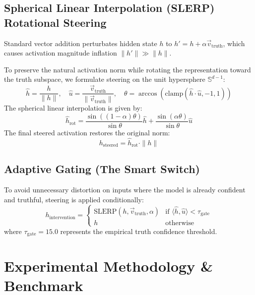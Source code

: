 \documentclass[11pt]{article}
\begin{document}
\subsection{Spherical Linear Interpolation (SLERP) Rotational Steering}
Standard vector addition perturbates hidden state $h$ to $h' = h + \alpha \vec{v}_{\text{truth}}$, which causes activation magnitude inflation $\|h'\| \gg \|h\|$. 

To preserve the natural activation norm while rotating the representation toward the truth subspace, we formulate steering on the unit hypersphere $\mathbb{S}^{d-1}$:
\begin{equation}
\hat{h} = \frac{h}{\|h\|}, \quad \hat{u} = \frac{\vec{v}_{\text{truth}}}{\|\vec{v}_{\text{truth}}\|}, \quad \theta = \arccos(\text{clamp}(\hat{h} \cdot \hat{u}, -1, 1))
\end{equation}
The spherical linear interpolation is given by:
\begin{equation}
\hat{h}_{\text{rot}} = \frac{\sin((1 - \alpha)\theta)}{\sin\theta}\hat{h} + \frac{\sin(\alpha\theta)}{\sin\theta}\hat{u}
\end{equation}
The final steered activation restores the original norm:
\begin{equation}
h_{\text{steered}} = \hat{h}_{\text{rot}} \cdot \|h\|
\end{equation}

\subsection{Adaptive Gating (The Smart Switch)}
To avoid unnecessary distortion on inputs where the model is already confident and truthful, steering is applied conditionally:
\begin{equation}
h_{\text{intervention}} = \begin{cases} 
\text{SLERP}(h, \vec{v}_{\text{truth}}, \alpha) & \text{if } \langle \hat{h}, \hat{u} \rangle < \tau_{\text{gate}} \\
h & \text{otherwise}
\end{cases}
\end{equation}
where $\tau_{\text{gate}} = 15.0$ represents the empirical truth confidence threshold.

\section{Experimental Methodology \& Benchmark}
\end{document}
